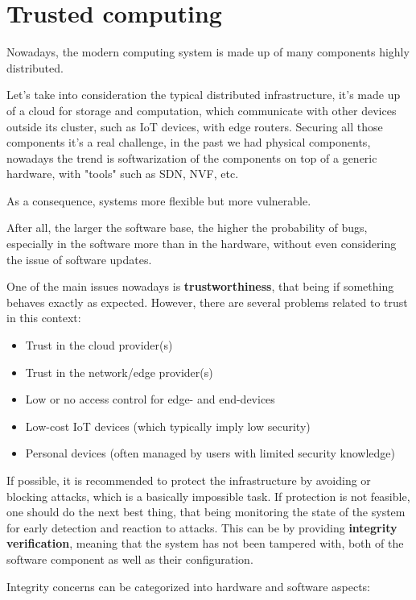 \chapter{Trusted computing}
Nowadays, the modern computing system is made up of many components
highly distributed.

Let's take into consideration the typical distributed infrastructure,
it's made up of a cloud for storage and computation, which communicate
with other devices outside its cluster, such as IoT devices, with edge
routers. Securing all those components it's a real challenge, in the
past we had physical components, nowadays the trend is softwarization 
of the components on top of a generic hardware, with "tools" such as
SDN, NVF, etc.
\begin{boxH}
  As a consequence, systems more flexible but more vulnerable.
\end{boxH}
After all, the larger the software base, the higher the probability of
bugs, especially in the software more than in the hardware, without
even considering the issue of software updates.

One of the main issues nowadays is \textbf{trustworthiness}, that being if
something behaves exactly as expected. However, there are several problems
related to trust in this context:

\begin{itemize}
    \item Trust in the cloud provider(s)
    \item Trust in the network/edge provider(s)
    \item Low or no access control for edge- and end-devices
    \item Low-cost IoT devices (which typically imply low security)
    \item Personal devices (often managed by users with limited 
          security knowledge)
\end{itemize}

If possible, it is recommended to protect the infrastructure by
avoiding or blocking attacks, which is a basically impossible task. If
protection is not feasible, one should do the next best thing, that
being monitoring the state of the system for early detection and
reaction to attacks. This can be by providing \textbf{integrity
verification}, meaning that the system has not been tampered with,
both of the software component as well as their configuration.

Integrity concerns can be categorized into hardware and 
software aspects:


